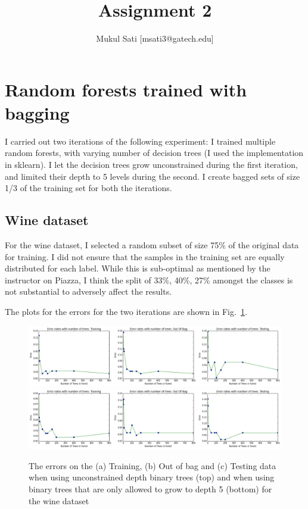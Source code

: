 \documentclass[5pt]{article}
\begin{document}
\title{Assignment 2}
\author{Mukul Sati [msati3@gatech.edu]}
\maketitle

\section{Random forests trained with bagging}
I carried out two iterations of the following experiment: I trained multiple
random forests, with varying number of decision trees (I used the
implementation in sklearn). I let the decision trees grow unconstrained during
the first iteration, and limited their depth to 5 levels during the second. I
create bagged sets of size 1/3 of the training set for both the iterations.

\subsection{Wine dataset}
For the wine dataset, I selected a random subset of size 75\% of the original
data for training. I did not ensure that the samples in the training set are
equally distributed for each label. While this is sub-optimal as mentioned by
the instructor on Piazza, I think the split of {33\%, 40\%, 27\%} amongst the
  classes is not substantial to adversely affect the results.

The plots for the errors for the two iterations are shown in
Fig.~\ref{fig:errorsWine}.

\begin{figure}
  \includegraphics[width=\textwidth]{images/baggingDepthInfiniteWine.png}
  \includegraphics[width=\textwidth]{images/baggingDepthLimitedWine.png}
\label{fig:errorsWine}
\caption{The errors on the (a) Training, (b) Out of bag and (c) Testing data
  when using unconstrained depth binary trees (top) and when using binary trees
  that are only allowed to grow to depth 5 (bottom) for the wine dataset}
\end{figure}
\end{document}
